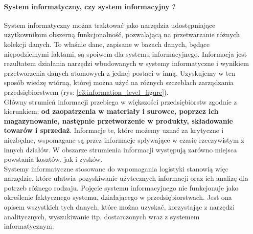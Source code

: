 		\paragraph{System informatyczny, czy system informacyjny ?}
		System informatyczny można traktować jako narzędzia udostępniające użytkownikom 
		obszerną funkcjonalność, pozwalającą na przetwarzanie różnych kolekcji danych.
		To właśnie dane, zapisane w bazach danych, będące niepodzielnymi faktami, są 
		spoiwem dla systemu informacyjnego. Informacja jest rezultatem działania
		narzędzi wbudowanych w systemy informatyczne i wynikiem przetwo\-rzenia danych 
		atomowych z jednej postaci w inną. Uzyskujemy w ten sposób wiedzę wtórną, której można 
		użyć na różnych szczeblach zarządzania przedsiębiorstwem (rys: \ref{c3:information_level_figure}). \\
		
		Główny strumień informacji przebiega w większości przedsiębiorstw zgodnie z kierunkiem: 
		\textbf{od zaopatrzenia w materiały i surowce, poprzez ich magazynowanie, następnie przetwo\-rzenie 
		w produkty, składowanie towarów i sprzedaż}. Informacje te, które możemy uznać za krytyczne
		i niezbędne, wspomagane są przez informacje spływające w czasie rzeczywistym z innych działów. 
		W obszarze strumienia informacji występują zarówno miejsca powstania kosztów, jak i zysków.  \\
		
		Systemy informatyczne stosowane do wspomagania logistyki stanowią więc narzędzie, które
		ułatwia pozyskiwanie użytecznych informacji oraz ich analizę dla potrzeb różnego rodzaju. 
		Pojęcie systemu informacyjnego nie funkcjonuje jako określenie faktycznego systemu, działającego
		w przedsiębiorstwach. Jest ona opisem wszystkich tych danych, które można uzyskać, korzystając
		z narzędzi analitycznych, wyszukiwanie itp. dostarczonych wraz z systemem informatycznym.
		
